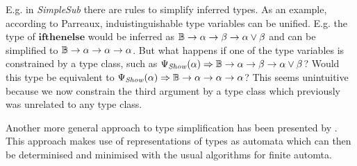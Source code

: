 E.g. in \emph{SimpleSub} \cite{10.1145/3409006} there are rules to simplify inferred types.
As an example, according to Parreaux, induistinguishable type variables can be unified.
E.g. the type of $\mathbf{ifthenelse}$ would be inferred as $\mathbb{B} \to \alpha \to \beta \to \alpha \vee \beta$ and can be simplified to $\mathbb{B} \to \alpha \to \alpha \to \alpha$.
But what happens if one of the type variables is constrained by a type class, such as $\Psi_\mathit{Show}(\alpha) \Rightarrow \mathbb{B} \to \alpha \to \beta \to \alpha \vee \beta$?
Would this type be equivalent to $\Psi_\mathit{Show}(\alpha) \Rightarrow \mathbb{B} \to \alpha \to \alpha \to \alpha$?
This seems unintuitive because we now constrain the third argument by a type class which previously was unrelated to any type class.

Another more general approach to type simplification has been presented by \cite{dolan2017subtyping}.
This approach makes use of representations of types as automata which can then be determinised and minimised with the usual algorithms for finite automta. 
\clearpage

